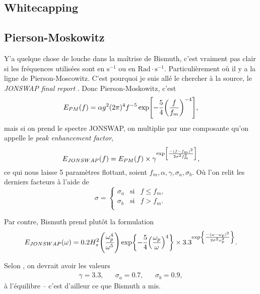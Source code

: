 \documentclass[10pt]{article}
\numberwithin{equation}{section}
\begin{document}
\subsection{Whitecapping}
\label{sec:org25601d5}

\subsection{Pierson-Moskowitz}
\label{sec:orgaccf29c}

Y'a quelque chose de louche dans la maîtrise de Bismuth, c'est vraiment pas clair si les fréquences utilisées sont en \(\mathrm{s}^{-1}\) ou en \(\mathrm{Rad}\cdot\mathrm{s}^{-1}\).
Particulièrement où il y a la ligne de Pierson-Moscowitz.
C'est pourquoi je suis allé le chercher à la source, le \emph{JONSWAP final report} \autocite{hasselmann1973measurements}.
Donc Pierson-Moskowitz, c'est
\begin{equation}
   E_{PM}(f) = \alpha g^2 (2\pi)^4 f^{-5} \exp[- \frac{5}{4} \qty(\frac{f}{f_m})^{-4}],
\end{equation}
mais si on prend le spectre JONSWAP, on multiplie par une composante qu'on appelle le \emph{peak enhancement factor},
\begin{equation}
   E_{JONSWAP}(f) = E_{PM}(f)\times\gamma^{\huge\exp[ \frac{-(f-f_m)^2}{2\sigma^2f_m^2}]},
\end{equation}
ce qui nous laisse 5 paramètres flottant, soient \(f_m, \alpha, \gamma, \sigma_a, \sigma_b\).
Où l'on relit les derniers facteurs à l'aide de
\begin{equation}
   \sigma = \left\lbrace\begin{matrix}
       \sigma_a & \mathrm{si} & f \leq f_m,\\
       \sigma_b & \mathrm{si} & f > f_m.\\
   \end{matrix}
  \right.
\end{equation}

Par contre, Bismuth prend plutôt la formulation
\begin{equation}
   E_{JONSWAP}(\omega) = 0.2H_s^2 \qty(\frac{\omega_p^4}{\omega^5}) \exp{-\frac{5}{4}\qty(\frac{\omega_p}{\omega})^4} \times 3.3^{\exp{\frac{-(\omega-\omega_p)^2}{2\sigma^2 \omega_p^2}}}.
\end{equation}

Selon \Textcite{hasselmann1973measurements}, on devrait avoir les valeurs
\begin{align}
   &&\gamma = 3.3, && \sigma_a = 0.7, && \sigma_b = 0.9, &&
\end{align}
à l'équilibre -- c'est d'ailleur ce que Bismuth a mis.\bigskip
\end{document}

